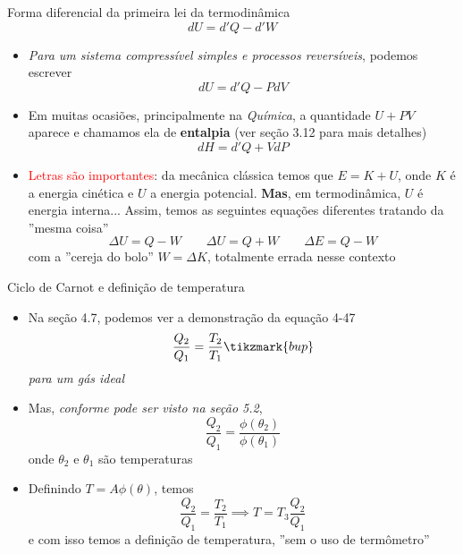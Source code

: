 \begin{frame}{Forma diferencial da primeira lei da termodinâmica}
    \[
        \boxed{dU = d'Q - d'W}
    \]
\begin{itemize}
    \item \textit{Para um sistema compressível simples e processos reversíveis}, podemos escrever
        \[
            dU=d'Q-PdV
        \]
    \item Em muitas ocasiões, principalmente na \textit{Química}, a quantidade
        \(U+PV\) aparece e chamamos ela de \textbf{entalpia} (ver seção 3.12 para mais detalhes)
        \[
            dH = d'Q+VdP
        \]
    \item \textcolor{red}{Letras são importantes}: da mecânica clássica temos que \(E=K+U\), onde \(K\)
        é a energia cinética e \(U\) a energia potencial. \textbf{Mas}, em termodinâmica, \(U\) é
        energia interna... Assim, temos as seguintes equações diferentes tratando da ''mesma coisa''
        \[
            \Delta U = Q-W \qquad \Delta U = Q+W \qquad \Delta E = Q - W
        \]
        com a ''cereja do bolo'' \(W=\Delta K\), totalmente errada nesse contexto
\end{itemize}
\end{frame}

\begin{frame}{Ciclo de Carnot e definição de temperatura}
    \begin{itemize}
        \item Na seção 4.7, podemos ver a demonstração da equação 4-47
            \[
                \frac{Q_2}{Q_1} = \frac{T_2}{T_1} \tikzmark{bup}
            \]
            \textit{para um gás ideal}
        \item Mas, \textit{conforme pode ser visto na seção 5.2}, 
            \[
                \frac{Q_2}{Q_1} = \frac{\phi(\theta_2)}{\phi(\theta_1)}
            \]
            onde \(\theta_2\) e \(\theta_1\) são temperaturas
        \item Definindo \(T=A\phi(\theta)\), temos
            \[
                \frac{Q_2}{Q_1} = \frac{T_2}{T_1} \implies T=T_3 \frac{Q_2}{Q_1}
            \]
            e com isso temos a definição de temperatura, ''sem o uso de termômetro'' 

    \end{itemize}
\end{frame}

